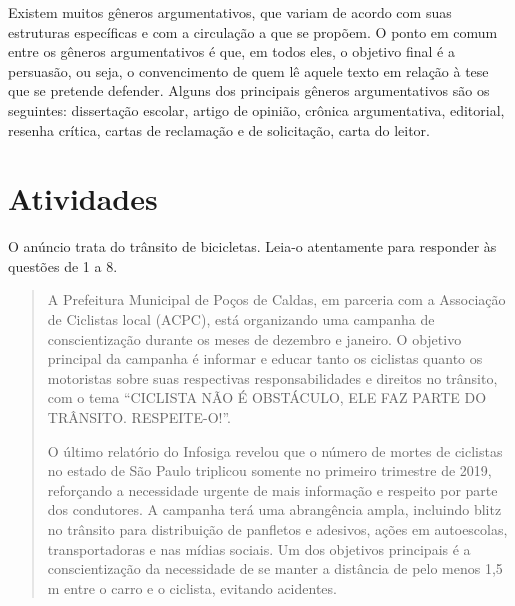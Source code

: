 {Existem muitos gêneros argumentativos, que variam de acordo com suas
estruturas específicas e com a circulação a que se propõem. O ponto em
comum entre os gêneros argumentativos é que, em todos eles, o objetivo
final é a persuasão, ou seja, o convencimento de quem lê aquele texto em
relação à tese que se pretende defender. Alguns dos principais gêneros
argumentativos são os seguintes: dissertação escolar, artigo de opinião,
crônica argumentativa, editorial, resenha crítica, cartas de reclamação
e de solicitação, carta do leitor.
}

\section{Atividades}

O anúncio trata do trânsito de bicicletas. Leia-o atentamente para
responder às questões de 1 a 8.



\begin{quote}
A Prefeitura Municipal de Poços de Caldas, em parceria com a Associação
de Ciclistas local (ACPC), está organizando uma campanha de
conscientização durante os meses de dezembro e janeiro. O objetivo
principal da campanha é informar e educar tanto os ciclistas quanto os
motoristas sobre suas respectivas responsabilidades e direitos no
trânsito, com o tema ``CICLISTA NÃO É OBSTÁCULO, ELE FAZ PARTE DO
TRÂNSITO. RESPEITE-O!''.

O último relatório do Infosiga revelou que o número de mortes de
ciclistas no estado de São Paulo triplicou somente no primeiro trimestre
de 2019, reforçando a necessidade urgente de mais informação e respeito
por parte dos condutores. A campanha terá uma abrangência ampla,
incluindo blitz no trânsito para distribuição de panfletos e adesivos,
ações em autoescolas, transportadoras e nas mídias sociais. Um dos
objetivos principais é a conscientização da necessidade de se manter a
distância de pelo menos 1,5 m entre o carro e o ciclista, evitando
acidentes.
\end{quote}

